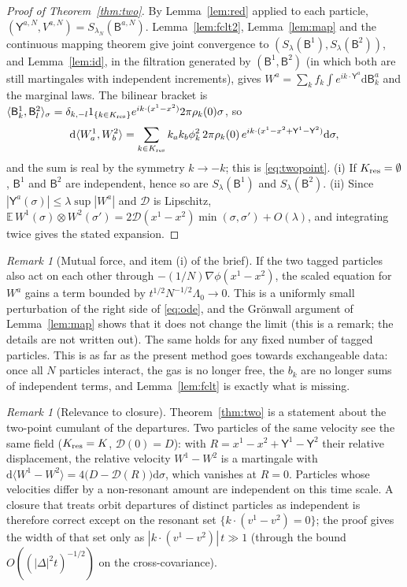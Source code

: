 \documentclass[11pt]{article}
\newcommand{\dd}{\mathrm{d}}
\newcommand{\E}{\mathbb{E}}
\newcommand{\sY}{\mathsf{Y}}
\newcommand{\sB}{\mathsf{B}}
\theoremstyle{remark}
\newtheorem{remark}[theorem]{Remark}
\begin{document}
\begin{proof}[Proof of Theorem~\ref{thm:two}]
By Lemma~\ref{lem:red} applied to each particle,
$(\sY^{a,N},V^{a,N})=S_{\lambda_N}(\sB^{a,N})$. Lemma~\ref{lem:fclt2},
Lemma~\ref{lem:map} and the continuous mapping theorem give joint
convergence to $(S_\lambda(\sB^1),S_\lambda(\sB^2))$, and
Lemma~\ref{lem:id}, in the filtration generated by $(\sB^1,\sB^2)$ (in which
both are still martingales with independent increments), gives
$W^a=\sum_kf_k\int e^{ik\cdot\sY^a}\dd\sB^a_k$ and the marginal laws. The
bilinear bracket is
$\langle\sB^1_k,\sB^2_l\rangle_\sigma
=\delta_{k,-l}1_{\{k\in K_{\rm res}\}}e^{ik\cdot(x^1-x^2)}2\pi\rho_k(0)\sigma$,
so
\[
  \dd\langle W^1_a,W^2_b\rangle
  =\sum_{k\in K_{\rm res}}k_ak_b\phi_k^2\,2\pi\rho_k(0)\,
   e^{ik\cdot(x^1-x^2+\sY^1-\sY^2)}\dd\sigma ,
\]
and the sum is real by the symmetry $k\to-k$; this is \eqref{eq:twopoint}.
(i) If $K_{\rm res}=\emptyset$, $\sB^1$ and $\sB^2$ are independent, hence so
are $S_\lambda(\sB^1)$ and $S_\lambda(\sB^2)$. (ii) Since
$|\sY^a(\sigma)|\le\lambda\sup|W^a|$ and $\mathcal D$ is Lipschitz,
$\E\,W^1(\sigma)\otimes W^2(\sigma')
=2\mathcal D(x^1-x^2)\min(\sigma,\sigma')+O(\lambda)$, and integrating twice
gives the stated expansion.
\end{proof}

\begin{remark}[Mutual force, and item (i) of the brief]\label{rem:mutual}
If the two tagged particles also act on each other through
$-(1/N)\nabla\phi(x^1-x^2)$, the scaled equation for $W^a$ gains a term
bounded by $t^{1/2}N^{-1/2}\Lambda_0\to0$. This is a uniformly small
perturbation of the right side of \eqref{eq:ode}, and the Gr\"onwall
argument of Lemma~\ref{lem:map} shows that it does not change the limit
(this is a remark; the details are not written out).
The same holds for any fixed number of tagged particles. This is as far as
the present method goes towards exchangeable data: once all $N$ particles
interact, the gas is no longer free, the $b_k$ are no longer sums of
independent terms, and Lemma~\ref{lem:fclt} is exactly what is missing.
\end{remark}

\begin{remark}[Relevance to closure]
Theorem~\ref{thm:two} is a statement about the two-point cumulant of the
departures. Two particles of the same velocity see the same field
($K_{\rm res}=K$, $\mathcal D(0)=D$): with $R=x^1-x^2+\sY^1-\sY^2$ their
relative displacement, the relative velocity $W^1-W^2$ is a martingale with
$\dd\langle W^1-W^2\rangle=4\bigl(D-\mathcal D(R)\bigr)\dd\sigma$, which
vanishes at $R=0$.
Particles whose velocities differ by a non-resonant amount are independent
on this time scale. A closure that treats orbit departures of distinct
particles as independent is therefore correct except on the resonant set
$\{k\cdot(v^1-v^2)=0\}$; the proof gives the width of that set only as
$|k\cdot(v^1-v^2)|\,t\gg1$ (through the bound $O((|\Delta|^2t)^{-1/2})$ on
the cross-covariance).
\end{remark}
\end{document}
